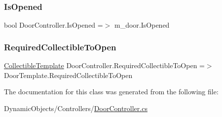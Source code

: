 \subsubsection{\texorpdfstring{Is\+Opened}{IsOpened}}
{\footnotesize\ttfamily bool Door\+Controller.\+Is\+Opened =$>$ m\+\_\+door.\+Is\+Opened}

\mbox{\label{class_door_controller_a814a28fe8149a1d4f154f5f9817540ab}} 
\subsubsection{\texorpdfstring{Required\+Collectible\+To\+Open}{RequiredCollectibleToOpen}}
{\footnotesize\ttfamily \mbox{\hyperlink{class_collectible_template}{Collectible\+Template}} Door\+Controller.\+Required\+Collectible\+To\+Open =$>$ Door\+Template.\+Required\+Collectible\+To\+Open}



The documentation for this class was generated from the following file\+:\begin{DoxyCompactItemize}
\item 
Dynamic\+Objects/\+Controllers/\mbox{\hyperlink{_door_controller_8cs}{Door\+Controller.\+cs}}\end{DoxyCompactItemize}
